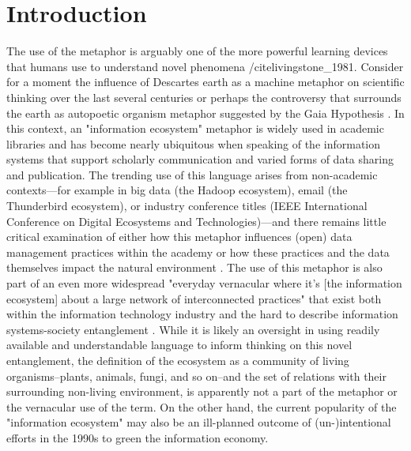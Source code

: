 \section{Introduction}

The use of the metaphor is arguably one of the more powerful learning devices that humans use to understand novel phenomena /cite{livingstone_1981}. Consider for a moment the influence of Descartes earth as a machine metaphor on scientific thinking over the last several centuries \cite{abram_1991} or perhaps the controversy that surrounds the earth as autopoetic organism metaphor suggested by the Gaia Hypothesis \cite{lovelock_1974}. In this context, an "information ecosystem" metaphor is widely used in academic libraries and has become nearly ubiquitous when speaking of the information systems that support scholarly communication and varied forms of data sharing and publication. The trending use of this language arises from non-academic contexts—for example in big data (the Hadoop ecosystem), email (the Thunderbird ecosystem), or industry conference titles (IEEE International Conference on Digital Ecosystems and Technologies)—and there remains little critical examination of either how this metaphor influences (open) data management practices within the academy or how these practices and the data themselves impact the natural environment \cite[although see][]{stepp_1999}. The use of this metaphor is also part of an even more widespread "everyday vernacular where it’s [the information ecosystem] about a large network of interconnected practices" that exist both within the information technology industry and the hard to describe information systems-society entanglement \cite{boyd_2016}. While it is likely an oversight in using readily available and understandable language to inform thinking on this novel entanglement, the definition of the ecosystem as a community of living organisms--plants, animals, fungi, and so on--and the set of relations with their surrounding non-living environment, is apparently not a part of the metaphor or the vernacular use of the term. On the other hand, the current popularity of the "information ecosystem" may also be an ill-planned outcome of (un-)intentional efforts in the 1990s to green the information economy.

